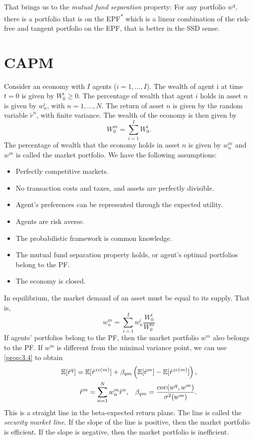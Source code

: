 \documentclass[twoside]{article}
\begin{document}
That brings us to the \textit{mutual fund separation} property: For any portfolio $w^q$, there is a portfolio that is on the EPF\textsuperscript{*} which is a linear combination of the risk-free and tangent portfolio on the EPF, that is better in the SSD sense. 

\section{CAPM}

Consider an economy with $I$ agents ($i = 1, \dots, I$). The wealth of agent i at time $t=0$ is given by $W^i_0 \geq 0$. The percentage of wealth that agent $i$ holds in asset $n$ is given by $w^i_n$, with $n = 1, \dots, N$. The return of asset $n$ is given by the random variable $\tilde{r}^n$, with finite variance. The wealth of the economy is then given by
\[
    W_0^m = \sum_{i=1}^{I} W_0^i.
\]
The percentage of wealth that the economy holds in asset $n$ is given by
$w^m_n$ and $w^m$ is called the market portfolio. We have the following assumptions:
\begin{itemize}
    \item Perfectly competitive markets.
    \item No transaction costs and taxes, and assets are perfectly divisible.
    \item Agent's preferences can be represented through the expected utility.
    \item Agents are risk averse.
    \item The probabilistic framework is common knowledge.
    \item The mutual fund separation property holds, or agent's optimal portfolios belong to the PF.
    \item The economy is closed.
\end{itemize}

In equilibrium, the market demand of an asset must be equal to its supply. That is,
\[
    w^m_n = \sum_{i=1}^{I} w^i_n \frac{W^i_0}{W^m_0}
\]
If agents' portfolios belong to the PF, then the market portfolio $w^m$ also belongs to the PF. If $w^m$ is different from the minimal variance point, we can use \cref{prop:3.4} to obtain
\begin{align*}
    \mathbb{E}[\tilde{r}^q] = \mathbb{E}[\tilde{r}^{zc(m)}] + \beta_{qm}\left(\mathbb{E}[\tilde{r}^m] - \mathbb{E}[\tilde{r}^{zc(m)}]\right), \\
    \tilde{r}^m = \sum_{n=1}^{N} w^m_n \tilde{r}^n, \;\;\; \beta_{qm} = \frac{cov(w^q, w^m)}{\sigma^2(w^m)}.
\end{align*}
This is a straight line in the beta-expected return plane. The line is called the \textit{security market line}. If the slope of the line is positive, then the market portfolio is efficient. If the slope is negative, then the market portfolio is inefficient. 
\end{document}
